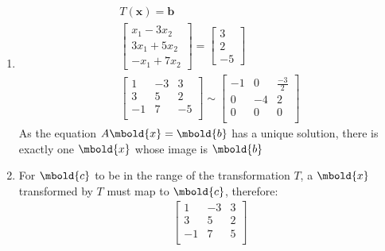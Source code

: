 \documentclass[12pt letter]{report}
\begin{document}
{{\begin{enumerate}
      \item
            \begin{align*}
              T \left( \mathbf{x} \right) = \mathbf{b} \\
              \begin{bmatrix}
                x_1 - 3x_2  \\
                3x_1 + 5x_2 \\
                -x_1 + 7x_2
              \end{bmatrix} = \begin{bmatrix}
                                3 \\  2\\  -5
                              \end{bmatrix}           \\
              \begin{bmatrix}
                1  & -3 & 3  \\
                3  & 5  & 2  \\
                -1 & 7  & -5 \\
              \end{bmatrix} \sim               \begin{bmatrix}
                                                 -1 & 0  & \frac{-3}{2} \\
                                                 0  & -4 & 2            \\
                                                 0  & 0  & 0            \\
                                               \end{bmatrix}
            \end{align*}
            As the equation $A \mbold{x} = \mbold{b}$ has a unique solution, there is exactly one $\mbold{x}$ whose
            image is $\mbold{b}$
      \item
            For $\mbold{c}$ to be in the range of the transformation $T$, a $\mbold{x}$ transformed by $T$ must map to
            $\mbold{c}$, therefore:
            \begin{align*}
              \begin{bmatrix}
                1  & -3 & 3 \\
                3  & 5  & 2 \\
                -1 & 7  & 5 \\
              \end{bmatrix}                        \\

\end{align*}
\end{enumerate}}}
\end{document}
